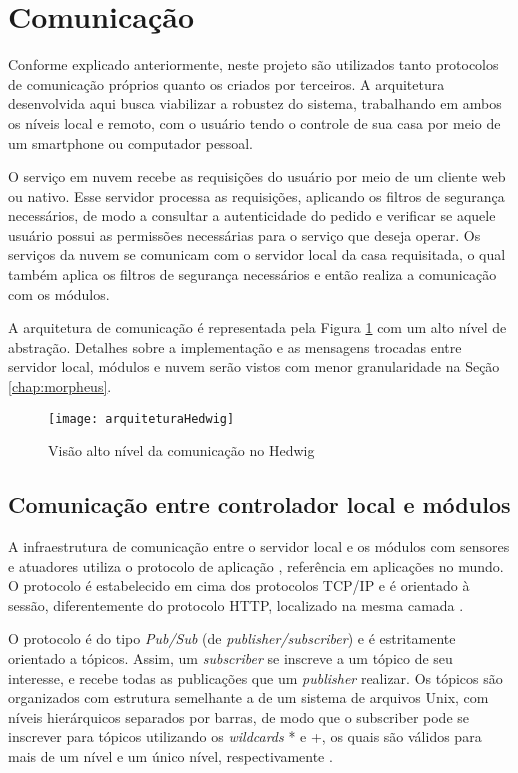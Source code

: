 \section{Comunicação}

Conforme explicado anteriormente, neste projeto são utilizados tanto protocolos de comunicação próprios quanto os criados por terceiros. A arquitetura desenvolvida aqui busca viabilizar a robustez do sistema, trabalhando em ambos os níveis local e remoto, com o usuário tendo o controle de sua casa por meio de um smartphone ou computador pessoal.

O serviço em nuvem recebe as requisições do usuário por meio de um cliente web ou nativo. Esse servidor processa as requisições, aplicando os filtros de segurança necessários, de modo a consultar a autenticidade do pedido e verificar se aquele usuário possui as permissões necessárias para o serviço que deseja operar. Os serviços da nuvem se comunicam com o servidor local da casa requisitada, o qual também aplica os filtros de segurança necessários e então realiza a comunicação com os módulos.

A arquitetura de comunicação é representada pela Figura \ref{fig:diagramaComunicacao} com um alto nível de abstração. Detalhes sobre a implementação e as mensagens trocadas entre servidor local, módulos e nuvem serão vistos com menor granularidade na Seção \ref{chap:morpheus}.

\begin{figure}[H]
	\centering
	\caption{Visão alto nível da comunicação no Hedwig}
	\texttt{[image: arquiteturaHedwig]}
	\label{fig:diagramaComunicacao}
\end{figure}

\subsection{Comunicação entre controlador local e módulos}

A infraestrutura de comunicação entre o servidor local e os módulos com sensores e atuadores utiliza o protocolo de aplicação \wmqtt{}, referência em aplicações \wiot{} no mundo. O protocolo \wmqtt{} é estabelecido em cima dos protocolos TCP/IP e é orientado à sessão, diferentemente do protocolo HTTP, localizado na mesma camada \cite{ibmMqtt}.

O protocolo \wmqtt{} é do tipo \emph{Pub/Sub} (de \textit{publisher/subscriber}) e é estritamente orientado a tópicos. Assim, um \textit{subscriber} se inscreve a um tópico de seu interesse, e recebe todas as publicações que um \textit{publisher} realizar. Os tópicos são organizados com estrutura semelhante a de um sistema de arquivos Unix, com níveis hierárquicos separados por barras, de modo que o subscriber pode se inscrever para tópicos utilizando os \textit{wildcards} * e +, os quais são válidos para mais de um nível e um único nível, respectivamente \cite{mqttDocumentation}.

